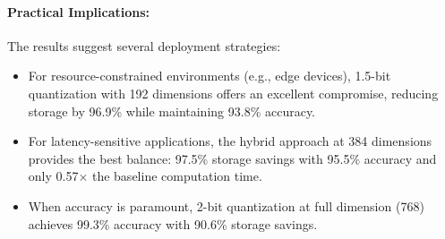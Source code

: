 
\noindent
\paragraph{Practical Implications:}
The results suggest several deployment strategies:
\begin{itemize}
    \item For resource-constrained environments (e.g., edge devices), 1.5-bit quantization with 192 dimensions offers an excellent compromise, reducing storage by 96.9\% while maintaining 93.8\% accuracy.
    \item For latency-sensitive applications, the hybrid approach at 384 dimensions provides the best balance: 97.5\% storage savings with 95.5\% accuracy and only 0.57× the baseline computation time.
    \item When accuracy is paramount, 2-bit quantization at full dimension (768) achieves 99.3\% accuracy with 90.6\% storage savings.
\end{itemize}

